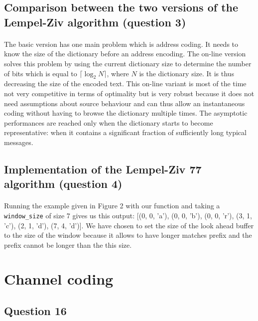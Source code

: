\documentclass[a4paper, 11pt, oneside]{article}
\begin{document}
\subsection{Comparison between the two versions of the Lempel-Ziv algorithm (question 3)}
\paragraph{}The basic version has one main problem which is address coding. It needs to know the
size of the dictionary before an address encoding. The on-line version solves this problem by using the current dictionary size to determine the number of bits which is equal to $\lceil\log_2{N}\rceil$, where $N$ is the dictionary size. It is thus decreasing the size of the encoded text. This on-line variant is most of the time not very competitive in
terms of optimality but is very robust because it does not need assumptions about source behaviour and can thus allow an instantaneous coding without having to browse the dictionary multiple times. The asymptotic performances are reached only when the dictionary starts to become
representative: when it contains a significant fraction of sufficiently long typical messages.

\subsection{Implementation of the Lempel-Ziv 77 algorithm (question 4)}
\paragraph{}Running the example given in Figure 2 with our function and taking a \texttt{window\_size} of size 7 gives us this output: [(0, 0, 'a'), (0, 0, 'b'), (0, 0, 'r'), (3, 1, 'c'), (2, 1, 'd'), (7, 4, 'd')]. We have chosen to set the size of the look ahead buffer to the size of the window because it allows to have longer matches prefix and the prefix cannot be longer than the this size.



\section{Channel coding}

\subsection{Question 16}
\end{document}

